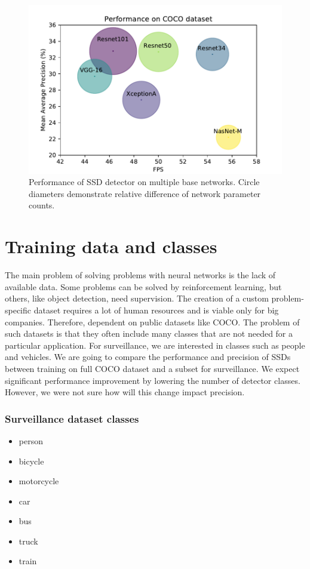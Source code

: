 \begin{figure}
    \centering
    \includegraphics[width=\textwidth]{img/fps_map_c}
    \caption[Performance of SSD with multiple base networks on COCO dataset]{Performance of SSD detector on multiple base networks. Circle diameters demonstrate relative difference of network parameter counts.}
    \label{fig:cocoperf}
\end{figure}

\section{Training data and classes}
The main problem of solving problems with neural networks is the lack of available data. Some problems can be solved by reinforcement learning, but others, like object detection, need supervision. The creation of a custom problem-specific dataset requires a lot of human resources and is viable only for big companies. Therefore, dependent on public datasets like COCO. The problem of such datasets is that they often include many classes that are not needed for a particular application. For surveillance, we are interested in classes such as people and vehicles. We are going to compare the performance and precision of SSDs between training on full COCO dataset and a subset for surveillance. We expect significant performance improvement by lowering the number of detector classes. However, we were not sure how will this change impact precision. 

\subsubsection{Surveillance dataset classes}
\begin{multicols}{2}
    \begin{itemize}
        \item person
        \item bicycle
        \item motorcycle
        \item car
        \item bus
        \item truck
        \item train
    \end{itemize}
\end{multicols}

